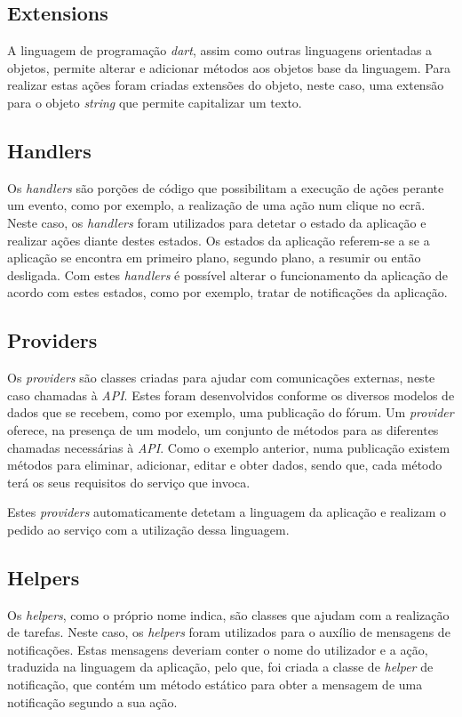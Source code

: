 \subsection{Extensions}
A linguagem de programação \textit{dart}, assim como outras linguagens orientadas a objetos, permite alterar e adicionar métodos aos objetos base da linguagem. Para realizar estas ações foram criadas extensões do objeto, neste caso, uma extensão para o objeto \textit{string} que permite capitalizar um texto.

\subsection{Handlers}
Os \textit{handlers} são porções de código que possibilitam a execução de ações perante um evento, como por exemplo, a realização de uma ação num clique no ecrã. Neste caso, os \textit{handlers} foram utilizados para detetar o estado da aplicação e realizar ações diante destes estados. Os estados da aplicação referem-se a se a aplicação se encontra em primeiro plano, segundo plano, a resumir ou então desligada. Com estes \textit{handlers} é possível alterar o funcionamento da aplicação de acordo com estes estados, como por exemplo, tratar de notificações da aplicação.

\subsection{Providers}
Os \textit{providers} são classes criadas para ajudar com comunicações externas, neste caso chamadas à \textit{API}. Estes foram desenvolvidos conforme os diversos modelos de dados que se recebem, como por exemplo, uma publicação do fórum. Um \textit{provider} oferece, na presença de um modelo, um conjunto de métodos para as diferentes chamadas necessárias à \textit{API}. Como o exemplo anterior, numa publicação existem métodos para eliminar, adicionar, editar e obter dados, sendo que, cada método terá os seus requisitos do serviço que invoca.

Estes \textit{providers} automaticamente detetam a linguagem da aplicação e realizam o pedido ao serviço com a utilização dessa linguagem.

\subsection{Helpers}
Os \textit{helpers}, como o próprio nome indica, são classes que ajudam com a realização de tarefas. Neste caso, os \textit{helpers} foram utilizados para o auxílio de mensagens de notificações. Estas mensagens deveriam conter o nome do utilizador e a ação, traduzida na linguagem da aplicação, pelo que, foi criada a classe de \textit{helper} de notificação, que contém um método estático para obter a mensagem de uma notificação segundo a sua ação.